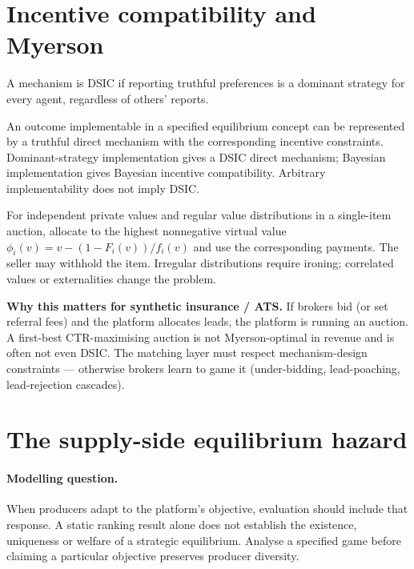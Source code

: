 \documentclass[11pt,oneside]{scrbook}
\begin{document}
\section{Incentive compatibility and Myerson}

\begin{definition}
A mechanism is DSIC if reporting truthful preferences is a dominant
strategy for every agent, regardless of others' reports.
\end{definition}

\begin{remark}
An outcome implementable in a specified equilibrium concept can be
represented by a truthful direct mechanism with the corresponding incentive
constraints. Dominant-strategy implementation gives a DSIC direct mechanism;
Bayesian implementation gives Bayesian incentive compatibility. Arbitrary
implementability does not imply DSIC.
\end{remark}
\begin{remark}
For independent private values and regular value distributions in a
single-item auction, allocate to the highest nonnegative virtual value
$\phi_i(v)=v-(1-F_i(v))/f_i(v)$ and use the corresponding payments.
The seller may withhold the item. Irregular distributions require ironing;
correlated values or externalities change the problem.
\end{remark}

\textbf{Why this matters for synthetic insurance / ATS.} If brokers bid (or set
referral fees) and the platform allocates leads, the platform is running an
auction. A first-best CTR-maximising auction is not Myerson-optimal in
revenue and is often not even DSIC. The matching layer must respect
mechanism-design constraints --- otherwise brokers learn to game it
(under-bidding, lead-poaching, lead-rejection cascades).

\section{The supply-side equilibrium hazard}

\paragraph{Modelling question.}
When producers adapt to the platform's objective, evaluation should include
that response. A static ranking result alone does not establish the existence,
uniqueness or welfare of a strategic equilibrium. Analyse a specified game
before claiming a particular objective preserves producer diversity.
\end{document}
